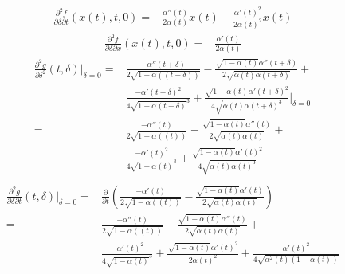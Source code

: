 \documentclass{article}
\begin{document}
\begin{equation}
   \begin{split}
       \frac{\partial^2 f}{\partial \delta\partial t}(x(t),t,0) =& \frac{\alpha''(t)}{2\alpha(t)}x(t)-\frac{\alpha'(t)^2}{2\alpha(t)^2}x(t)
   \end{split}
\end{equation}
\begin{equation}
   \begin{split}
       \frac{\partial^2 f}{\partial \delta\partial x}(x(t),t,0) =& \frac{\alpha'(t)}{2\alpha(t)}
   \end{split}
\end{equation}
\begin{equation}
   \begin{split}
       \frac{\partial^2 g}{\partial \delta^2}(t, \delta)|_{\delta=0} =& \frac{-\alpha''(t+\delta)}{2\sqrt{1-\alpha((t+\delta))}} - \frac{\sqrt{1-\alpha(t)}\alpha''(t+\delta)}{2\sqrt{\alpha(t)\alpha(t+\delta)}} + \\
                                           & \frac{-\alpha'(t+\delta)^2}{4\sqrt{1-\alpha(t+\delta)}^3} + \frac{\sqrt{1-\alpha(t)}\alpha'(t+\delta)^2}{4\sqrt{\alpha(t)\alpha(t+\delta)^3}}|_{\delta=0} \\
                                           =& \frac{-\alpha''(t)}{2\sqrt{1-\alpha((t))}} - \frac{\sqrt{1-\alpha(t)}\alpha''(t)}{2\sqrt{\alpha(t)\alpha(t)}} + \\
                                           & \frac{-\alpha'(t)^2}{4\sqrt{1-\alpha(t)}^3} + \frac{\sqrt{1-\alpha(t)}\alpha'(t)^2}{4\sqrt{\alpha(t)\alpha(t)^3}} \\
   \end{split}
\end{equation}
\begin{equation}
   \begin{split}
       \frac{\partial^2 g}{\partial \delta\partial t}(t, \delta)|_{\delta=0} =& \frac{\partial}{\partial t}\left(\frac{-\alpha'(t)}{2\sqrt{1-\alpha((t))}} - \frac{\sqrt{1-\alpha(t)}\alpha'(t)}{2\sqrt{\alpha(t)\alpha(t)}}\right) \\
                                           =& \frac{-\alpha''(t)}{2\sqrt{1-\alpha((t))}} - \frac{\sqrt{1-\alpha(t)}\alpha''(t)}{2\sqrt{\alpha(t)\alpha(t)}} + \\
                                           & \frac{-\alpha'(t)^2}{4\sqrt{1-\alpha(t)}^3} + \frac{\sqrt{1-\alpha(t)}\alpha'(t)^2}{2\alpha(t)^2} + \frac{\alpha'(t)^2}{4\sqrt{\alpha^2(t)(1-\alpha(t))}}  
   \end{split}
\end{equation}
\end{document}
